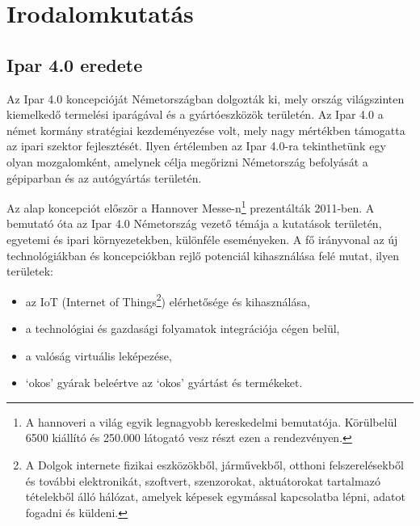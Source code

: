 \documentclass[../documentation.tex]{subfiles}
\begin{document}
\section{Irodalomkutatás}
\subsection{Ipar 4.0 eredete}
Az Ipar 4.0 koncepcióját Németországban dolgozták ki, mely ország világszinten kiemelkedő termelési iparágával és a gyártóeszközök területén. Az Ipar 4.0 a német kormány stratégiai kezdeményezése volt, mely nagy mértékben támogatta az ipari szektor fejlesztését. Ilyen értélemben az Ipar 4.0-ra tekinthetünk egy olyan mozgalomként, amelynek célja megőrizni Németország befolyását a gépiparban és az autógyártás területén.\cite{industry40}

Az alap koncepciót először a Hannover Messe-n\footnote{A hannoveri a világ egyik legnagyobb kereskedelmi bemutatója. Körülbelül 6500 kiállító és 250.000 látogató vesz részt ezen a rendezvényen.} prezentálták 2011-ben. A bemutató óta az Ipar 4.0 Németország vezető témája a kutatások területén, egyetemi és ipari környezetekben, különféle eseményeken. A fő irányvonal az új technológiákban és koncepciókban rejlő potenciál kihasználása felé mutat, ilyen területek:
\begin{itemize}
	\item az IoT (\foreignlanguage{british}{Internet of Things}\footnote{A Dolgok internete fizikai eszközökből, járművekből, otthoni felszerelésekből és további elektronikát, szoftvert, szenzorokat, aktuátorokat tartalmazó tételekből álló hálózat, amelyek képesek egymással kapcsolatba lépni, adatot fogadni és küldeni.}) elérhetősége és kihasználása,
	\item a technológiai és gazdasági folyamatok integrációja cégen belül,
	\item a valóság virtuális leképezése,
	\item `okos' gyárak beleértve az `okos' gyártást és termékeket.
\end{itemize}
\end{document}
